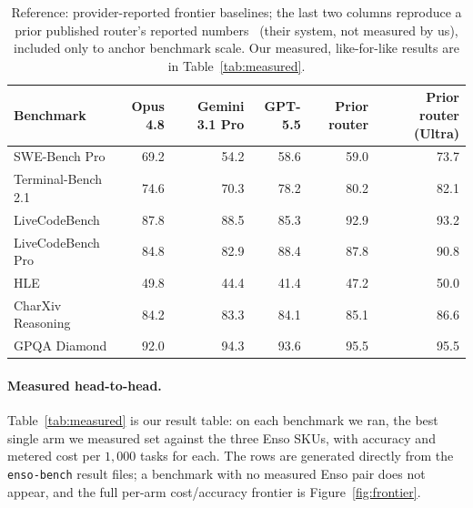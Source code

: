 \documentclass[11pt]{article}
\begin{document}
\begin{table}[t]
\centering
\small
\setlength{\tabcolsep}{5pt}
\caption{Reference: provider-reported frontier baselines; the last two columns
reproduce a prior published router's reported numbers~\cite{priororchestrator}
(their system, not measured by us), included only to anchor benchmark scale. Our
measured, like-for-like results are in Table~\ref{tab:measured}.}
\label{tab:reference}
\begin{tabular}{@{}lrrrrr@{}}
\toprule
Benchmark & Opus 4.8 & Gemini 3.1 Pro & GPT-5.5 & Prior router & Prior router (Ultra) \\
\midrule
SWE-Bench Pro        & 69.2 & 54.2 & 58.6 & 59.0 & 73.7 \\
Terminal-Bench 2.1   & 74.6 & 70.3 & 78.2 & 80.2 & 82.1 \\
LiveCodeBench        & 87.8 & 88.5 & 85.3 & 92.9 & 93.2 \\
LiveCodeBench Pro    & 84.8 & 82.9 & 88.4 & 87.8 & 90.8 \\
HLE                  & 49.8 & 44.4 & 41.4 & 47.2 & 50.0 \\
CharXiv Reasoning    & 84.2 & 83.3 & 84.1 & 85.1 & 86.6 \\
GPQA Diamond         & 92.0 & 94.3 & 93.6 & 95.5 & 95.5 \\
\bottomrule
\end{tabular}
\end{table}

\paragraph{Measured head-to-head.} Table~\ref{tab:measured} is our result table:
on each benchmark we ran, the best single arm we measured set against the three
Enso SKUs, with accuracy and metered cost per $1{,}000$ tasks for each. The rows
are generated directly from the \texttt{enso-bench} result files; a benchmark with
no measured Enso pair does not appear, and the full per-arm cost/accuracy frontier
is Figure~\ref{fig:frontier}.
\end{document}
